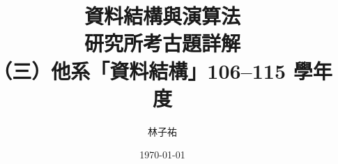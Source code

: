 \documentclass[12pt]{report}
\title{資料結構與演算法\\研究所考古題詳解\\[0.3em]{\LARGE （三）他系「資料結構」106--115 學年度}}
\author{林子祐}
\date{\today}
\renewcommand{\chaptermark}[1]{\markboth{第~\thechapter~章\quad #1}{}}
\begin{document}
\maketitle
\romantableofcontents




\appendix
{}
\renewcommand{\chaptermark}[1]{\markboth{附錄~\thechapter\quad #1}{}}


\end{document}
